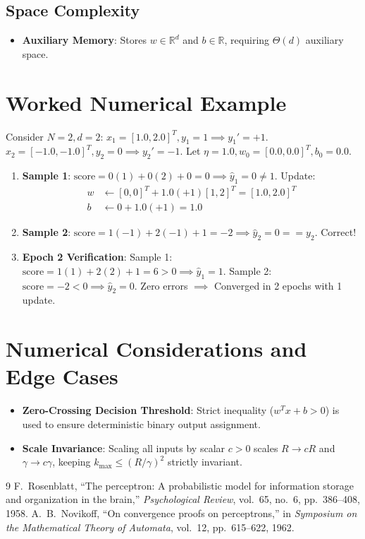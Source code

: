 \documentclass[11pt,a4paper]{article}
\theoremstyle{definition}
\begin{document}
\subsection{Space Complexity}
\begin{itemize}
    \item \textbf{Auxiliary Memory}: Stores $w \in \mathbb{R}^d$ and $b \in \mathbb{R}$, requiring $\Theta(d)$ auxiliary space.
\end{itemize}

\section{Worked Numerical Example}

Consider $N=2, d=2$:
$x_1 = [1.0, 2.0]^T, y_1 = 1 \implies y_1' = +1$.
$x_2 = [-1.0, -1.0]^T, y_2 = 0 \implies y_2' = -1$.
Let $\eta = 1.0, w_0 = [0.0, 0.0]^T, b_0 = 0.0$.

\begin{enumerate}
    \item \textbf{Sample 1}: $\text{score} = 0(1) + 0(2) + 0 = 0 \implies \hat{y}_1 = 0 \ne 1$. Update:
    \begin{align}
    w &\gets [0, 0]^T + 1.0(+1)[1, 2]^T = [1.0, 2.0]^T \\
    b &\gets 0 + 1.0(+1) = 1.0
    \end{align}
    \item \textbf{Sample 2}: $\text{score} = 1(-1) + 2(-1) + 1 = -2 \implies \hat{y}_2 = 0 == y_2$. Correct!
    \item \textbf{Epoch 2 Verification}:
    Sample 1: $\text{score} = 1(1) + 2(2) + 1 = 6 > 0 \implies \hat{y}_1 = 1$.
    Sample 2: $\text{score} = -2 < 0 \implies \hat{y}_2 = 0$.
    Zero errors $\implies$ Converged in 2 epochs with 1 update.
\end{enumerate}

\section{Numerical Considerations and Edge Cases}

\begin{itemize}
    \item \textbf{Zero-Crossing Decision Threshold}: Strict inequality ($w^T x + b > 0$) is used to ensure deterministic binary output assignment.
    \item \textbf{Scale Invariance}: Scaling all inputs by scalar $c > 0$ scales $R \to c R$ and $\gamma \to c \gamma$, keeping $k_{\max} \le (R/\gamma)^2$ strictly invariant.
\end{itemize}

\begin{thebibliography}{9}
 F.~Rosenblatt, ``The perceptron: A probabilistic model for information storage and organization in the brain,'' \emph{Psychological Review}, vol.~65, no.~6, pp.~386--408, 1958.
 A.~B.~Novikoff, ``On convergence proofs on perceptrons,'' in \emph{Symposium on the Mathematical Theory of Automata}, vol.~12, pp.~615--622, 1962.
\end{thebibliography}
\end{document}
